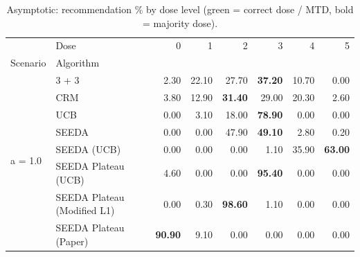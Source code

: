 \begin{table}[H]
\centering
\caption{Asymptotic: recommendation \% by dose level (green = correct dose / MTD, bold = majority dose).}
\label{tab:asym_rec_by_dose}
\begin{tabular}{llrrrrrr}
\toprule
 & Dose & 0 & 1 & 2 & 3 & 4 & 5 \\
Scenario & Algorithm &  &  &  &  &  &  \\
\midrule
\multirow[c]{8}{*}{a = 1.0} & 3 + 3 & 2.30 & 22.10 & {\cellcolor[HTML]{C8E6C9}} 27.70 & \bfseries 37.20 & 10.70 & 0.00 \\
 & CRM & 3.80 & 12.90 & {\cellcolor[HTML]{C8E6C9}} \bfseries 31.40 & 29.00 & 20.30 & 2.60 \\
 & UCB & 0.00 & 3.10 & {\cellcolor[HTML]{C8E6C9}} 18.00 & \bfseries 78.90 & 0.00 & 0.00 \\
 & SEEDA & 0.00 & 0.00 & {\cellcolor[HTML]{C8E6C9}} 47.90 & \bfseries 49.10 & 2.80 & 0.20 \\
 & SEEDA (UCB) & 0.00 & 0.00 & {\cellcolor[HTML]{C8E6C9}} 0.00 & 1.10 & 35.90 & \bfseries 63.00 \\
 & SEEDA Plateau (UCB) & 4.60 & 0.00 & {\cellcolor[HTML]{C8E6C9}} 0.00 & \bfseries 95.40 & 0.00 & 0.00 \\
 & SEEDA Plateau (Modified L1) & 0.00 & 0.30 & {\cellcolor[HTML]{C8E6C9}} \bfseries 98.60 & 1.10 & 0.00 & 0.00 \\
 & SEEDA Plateau (Paper) & \bfseries 90.90 & 9.10 & {\cellcolor[HTML]{C8E6C9}} 0.00 & 0.00 & 0.00 & 0.00 \\
\bottomrule
\end{tabular}
\end{table}
